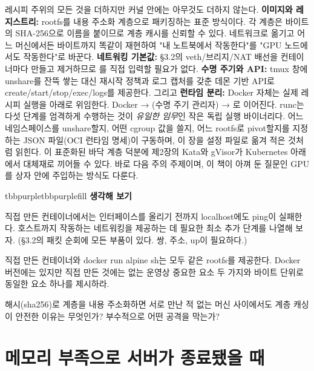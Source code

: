 레시피 주위의 모든 것을 더하지만 커널 안에는 아무것도 더하지 않는다. \textbf{이미지와 레지스트리:} rootfs를 내용 주소화 계층으로 패키징하는 표준 방식이다. 각 계층은 바이트의 SHA-256으로 이름을 붙이므로 계층 캐시를 신뢰할 수 있다. 네트워크로 옮기고 어느 머신에서든 바이트까지 똑같이 재현하여 "내 노트북에서 작동한다"를 "GPU 노드에서도 작동한다"로 바꾼다. \textbf{네트워킹 기본값:} §3.2의 veth/브리지/NAT 배선을 컨테이너마다 만들고 제거하므로 를 직접 입력할 필요가 없다. \textbf{수명 주기와 API:} tmux 창에 unshare를 잔뜩 쌓는 대신 재시작 정책과 로그 캡처를 갖춘 데몬 기반 API로 create/start/stop/exec/logs를 제공한다. 그리고 \textbf{런타임 분리:} Docker 자체는 실제 레시피 실행을 아래로 위임한다. Docker → (수명 주기 관리자) → 로 이어진다. runc는 다섯 단계를 엄격하게 수행하는 것이 \textit{유일한 임무}인 작은 독립 실행 바이너리다. 어느 네임스페이스를 unshare할지, 어떤 cgroup 값을 쓸지, 어느 rootfs로 pivot할지를 지정하는 JSON 파일(OCI 런타임 명세)이 구동하며, 이 장을 설정 파일로 옮겨 적은 것처럼 읽힌다. 이 표준화된 바닥 계층 덕분에 제2장의 Kata와 gVisor가 Kubernetes 아래에서 대체재로 끼어들 수 있다. 바로 다음 주의 주제이며, 이 책이 아껴 둔 질문인 GPU를 상자 안에 주입하는 방식도 다룬다.

\begin{calloutbox}{tbbpurple}{tbbpurplefill}
{\normalsize\bfseries\color{tbbpurple}생각해 보기}\par\vspace{3pt}
\begin{tbbitemize}
  \item 직접 만든 컨테이너에서는 인터페이스를 올리기 전까지 localhost에도 ping이 실패한다. 호스트까지 작동하는 네트워킹을 제공하는 데 필요한 최소 추가 단계를 나열해 보자. (§3.2의 패킷 순회에 모든 부품이 있다. 쌍, 주소, up이 필요하다.)
  \item 직접 만든 컨테이너와 docker run alpine sh는 모두 같은 rootfs를 제공한다. Docker 버전에는 있지만 직접 만든 것에는 없는 운영상 중요한 요소 두 가지와 바이트 단위로 동일한 요소 하나를 제시하라.
  \item 해시(sha256)로 계층을 내용 주소화하면 서로 만난 적 없는 머신 사이에서도 계층 캐싱이 안전한 이유는 무엇인가? 부수적으로 어떤 공격을 막는가?
\end{tbbitemize}
\end{calloutbox}

\section{메모리 부족으로 서버가 종료됐을 때}

